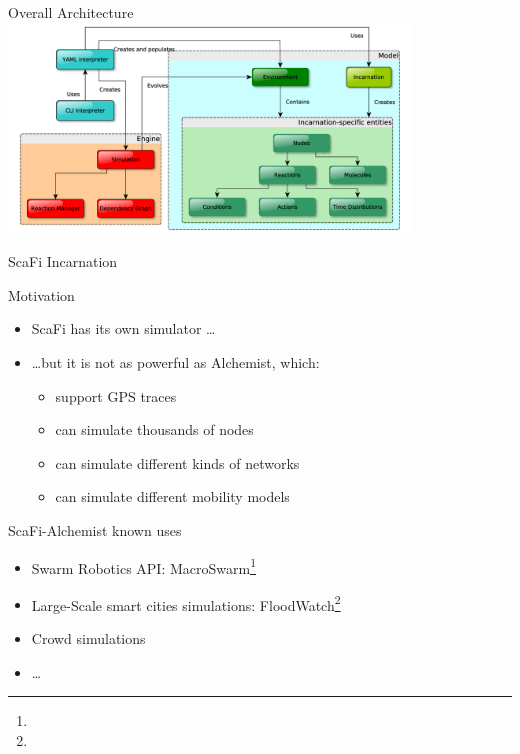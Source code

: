 \documentclass[presentation, 9pt]{beamer}\mode<presentation>{\usetheme{AMSBolognaFC}}
\begin{document}
\begin{frame}{Overall Architecture}
\centering
\includegraphics[width=0.8\textwidth]{img/alchemist-architecture.png}
\end{frame}
\begin{frame}{ScaFi Incarnation}
\begin{block}{Motivation}
	\begin{itemize}
		\item ScaFi has its own simulator \dots
		\item \dots but it is not as powerful as Alchemist, which:
		\begin{itemize}
			\item support GPS traces
			\item can simulate thousands of nodes
			\item can simulate different kinds of networks
			\item can simulate different mobility models
		\end{itemize}
	\end{itemize}
\end{block}
\begin{exampleblock}{ScaFi-Alchemist known uses}
	\begin{itemize}
		\item Swarm Robotics API: MacroSwarm\footnote[frame]{}
		\item Large-Scale smart cities simulations: FloodWatch\footnote[frame]{}
		\item Crowd simulations
		\item \dots
	\end{itemize}
\end{exampleblock}
\end{frame}
\end{document}
